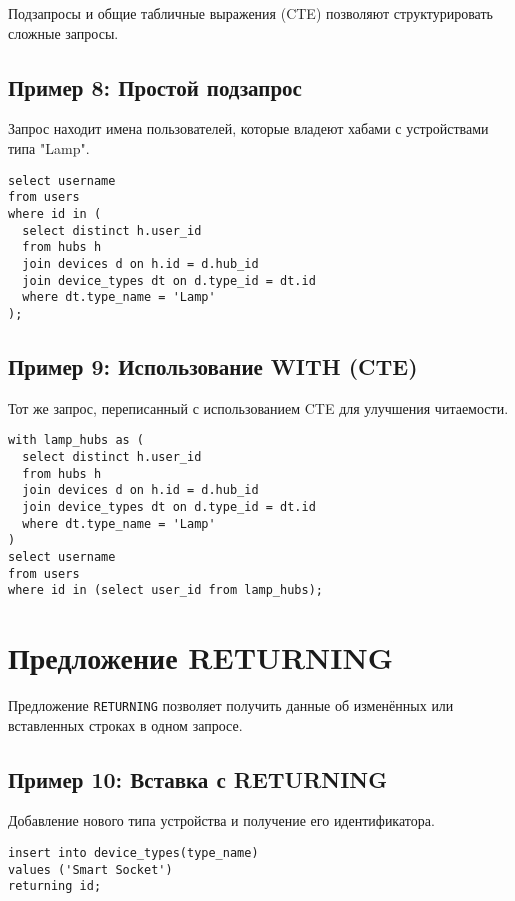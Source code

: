 \documentclass[oneside,a4paper,14pt]{extarticle}
\begin{document}
Подзапросы и общие табличные выражения (CTE) позволяют структурировать сложные запросы.

\subsection*{Пример 8: Простой подзапрос}

Запрос находит имена пользователей, которые владеют хабами с устройствами типа "Lamp".

\begin{verbatim}
select username 
from users 
where id in (
  select distinct h.user_id 
  from hubs h 
  join devices d on h.id = d.hub_id
  join device_types dt on d.type_id = dt.id
  where dt.type_name = 'Lamp'
);
\end{verbatim}

\subsection*{Пример 9: Использование WITH (CTE)}

Тот же запрос, переписанный с использованием CTE для улучшения читаемости.

\begin{verbatim}
with lamp_hubs as (
  select distinct h.user_id 
  from hubs h 
  join devices d on h.id = d.hub_id
  join device_types dt on d.type_id = dt.id
  where dt.type_name = 'Lamp'
)
select username 
from users 
where id in (select user_id from lamp_hubs);
\end{verbatim}

\clearpage
\section*{Предложение RETURNING}

Предложение \texttt{RETURNING} позволяет получить данные об изменённых или вставленных строках в одном запросе.

\subsection*{Пример 10: Вставка с RETURNING}

Добавление нового типа устройства и получение его идентификатора.

\begin{verbatim}
insert into device_types(type_name) 
values ('Smart Socket') 
returning id;
\end{verbatim}
\end{document}

